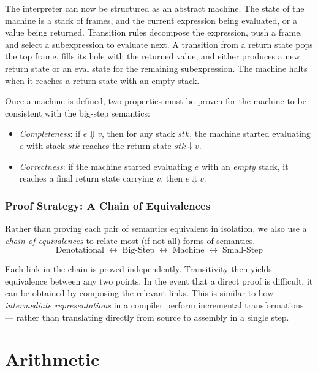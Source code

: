 The interpreter can now be structured as an abstract machine. The state of the machine is a stack of frames, and the current expression being evaluated, or a value being returned. 
Transition rules decompose the expression, push a frame, and select a subexpression to evaluate next.
A transition from a return state pops the top frame, fills its hole with the returned value, and either produces a new return state or an eval state for the remaining subexpression.
The machine halts when it reaches a return state with an empty stack.

Once a machine is defined, two properties must be proven for the machine to be consistent with the big-step semantics:

\begin{itemize}
\item  \textit{Completeness}: if $e \Downarrow v$, then for any stack $\mathit{stk}$, the machine started evaluating $e$ with stack $\mathit{stk}$ reaches the return state ${stk} \downarrow v$.

\item  \textit{Correctness}: if the machine started evaluating $e$ with an \emph{empty} stack, it reaches a final return state carrying $v$, then $e \Downarrow v$.
\end{itemize}

\subsection*{Proof Strategy: A Chain of Equivalences}

Rather than proving each pair of semantics equivalent in isolation, we also use a \emph{chain of equivalences} to relate most (if not all) forms of semantics.
\[
  \text{Denotational}
  \;\longleftrightarrow\;
  \text{Big-Step}
  \;\longleftrightarrow\;
  \text{Machine}
  \;\longleftrightarrow\;
  \text{Small-Step}
\]

Each link in the chain is proved independently. Transitivity then yields equivalence between any two points.
In the event that a direct proof is difficult, it can be obtained by composing the relevant links.
This is similar to how \emph{intermediate representations} in a compiler perform incremental transformations --- rather than translating directly from source to assembly in a single step.

\chapter{Arithmetic}
\label{chap:arith}

